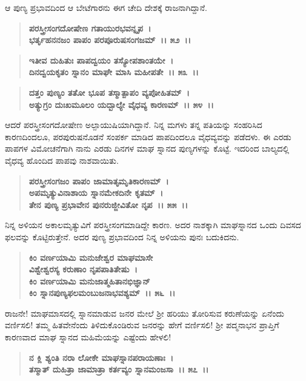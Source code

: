 ಆ ಪುಣ್ಯ ಪ್ರಭಾವದಿಂದ ಆ ಬೇಟೆಗಾರನು ಈಗ ಚೇದಿ ದೇಶಕ್ಕೆ ರಾಜನಾಗಿದ್ದಾನೆ.

\begin{verse}
\textbf{ಪರಸ್ತ್ರೀಸಂಗದೋಷೇಣ ಗತಾಯುರಭವನ್ನೃಪ~।}\\\textbf{ಭರ್ತೃಹನನಜಂ ಪಾಪಂ ಪರಪೂರುಷಸಂಗಜಮ್~।। ೫೨~।। }
\end{verse}

\begin{verse}
\textbf{ಇತೀವ ದುಹಿತುಃ ಪಾಪದ್ವಯಂ ತಸ್ಯೋಪಶಾಂತಯೇ~।}\\\textbf{ದಿನದ್ವಯಕೃತಂ ಸ್ನಾನಂ ಮಾಘೇ ಮಾಸಿ ಮಹೀಪತೇ~।। ೫೩~।। }
\end{verse}

\begin{verse}
\textbf{ದತ್ತಂ ಪುಣ್ಯಂ ತತೋ ಭೂಪ ತಸ್ಮಾತ್ಪಾಪಂ ವ್ಯಪೋಹಿತಮ್~।}\\\textbf{ಅತ್ಯುಗ್ರಂ ದುಃಖಮೂಲಂ ಯದ್ಬಾಲ್ಯೇ ವೈಧವ್ಯ ಕಾರಣಮ್~।। ೫೪~।।}
\end{verse}

ಆದರೆ ಪರಸ್ತ್ರೀಸಂಗದೋಷೇಣ ಅಲ್ಪಾಯುಷಿಯಾಗಿದ್ದಾನೆ. ನಿನ್ನ ಮಗಳು ತನ್ನ ಪತಿಯನ್ನು ಸಂಹರಿಸಿದ ಕಾರಣದಿಂದಲೂ, ಪರಪುರುಷನೊಡನೆ ಸಂಪರ್ಕ ಮಾಡಿದ ಪಾಪದಿಂದಲೂ ವೈಧವ್ಯವನ್ನು ಪಡೆದಳು. ಈ ಎರಡು ಪಾಪಗಳ ವಿಮೋಚನೆಗಾಗಿ ನಾನು ಎರಡು ದಿನಗಳ ಮಾಘ ಸ್ನಾನದ ಪುಣ್ಯಗಳನ್ನು ಕೊಟ್ಟೆ. ಇದರಿಂದ ಬಾಲ್ಯದಲ್ಲಿ ವೈಧವ್ಯ ಹೊಂದಿದ ಪಾಪವು ನಾಶವಾಯಿತು.

\begin{verse}
\textbf{ಪರಸ್ತ್ರೀಸಂಗಜಂ ಪಾಪಂ ಜಾಮಾತೃಮೃತಿಕಾರಣಮ್~।}\\\textbf{ಅಪಮೃತ್ಯುವಿನಾಶಾಯ ಸ್ನಾನಮೇಕದಿನೇ ಕೃತಮ್~। }\\\textbf{ತೇನ ಪುಣ್ಯ ಪ್ರಭಾವೇನ ಪುನರುಜ್ಜೀವಿತೋ ನೃಪ~।। ೫೫~।।}
\end{verse}

ನಿನ್ನ ಅಳಿಯನ ಅಕಾಲಮೃತ್ಯುವಿಗೆ ಪರಸ್ತ್ರೀಸಂಗಮಾಡಿದ್ದೇ ಕಾರಣ. ಅದರ ನಾಶಕ್ಕಾಗಿ ಮಾಘಸ್ನಾನದ ಒಂದು ದಿವಸದ ಫಲವನ್ನು ಕೊಟ್ಟಿರುತ್ತೇನೆ. ಅದರ ಪುಣ್ಯ ಪ್ರಭಾವದಿಂದ ನಿನ್ನ ಅಳಿಯನು ಪುನಃ ಬದುಕಿದನು.

\begin{verse}
\textbf{ಕಿಂ ವರ್ಣಯಾಮಿ ಮನುಜೇಶ್ವರ ಮಾಘಮಾಸೇ}\\\textbf{ವಿಶ್ವೇಶ್ವರಸ್ಯ ಕರುಣಾಂ ನೃಪಪಾತಿತೇಷು~। }\\\textbf{ಕಿಂ ವರ್ಣಯಾಮಿ ಮನುಜಾತ್ಮಹಿತಾನಭಿಜ್ಞಾನ್} \\\textbf{ಕಿಂ ಸ್ನಾನಪುಣ್ಯಫಲಮಂಬುಜನಾಭವಶ್ಯಮ್~।। ೫೬~।।}
\end{verse}

ರಾಜನೇ! ಮಾಘಮಾಸದಲ್ಲಿ ಸ್ನಾನಮಾಡುವ ಜನರ ಮೇಲೆ ಶ‍್ರೀ ಹರಿಯು ತೋರಿಸುವ ಕರುಣೆಯನ್ನು ಏನೆಂದು ವರ್ಣಿಸಲಿ! ತಮ್ಮ ಹಿತವೇನೆಂದು ತಿಳಿದುಕೊಂಡಿರುವ ಜನರನ್ನು ಹೇಗೆ ವರ್ಣಿಸಲಿ! ಶ‍್ರೀ ಪದ್ಮನಾಭನ ಪ್ರಾಪ್ತಿಗೆ ಕಾರಣವಾದ ಮಾಘ ಸ್ನಾನದ ಮಹಿಮೆಯನ್ನು ಎಷ್ಟೆಂದು ಹೇಳಲಿ!

\begin{verse}
\textbf{ನ ಕ್ಲಿ ಶ್ಯಂತಿ ನರಾ ಲೋಕೇ ಮಾಘಸ್ನಾನಪರಾಯಣಾಃ~।}\\\textbf{ತಸ್ಮಾತ್ ದುಹಿತ್ರಾ ಜಾಮಾತ್ರಾ ಕರ್ತವ್ಯಂ ಸ್ನಾನಮಂಜಸಾ~।। ೫೭~।। }
\end{verse}

